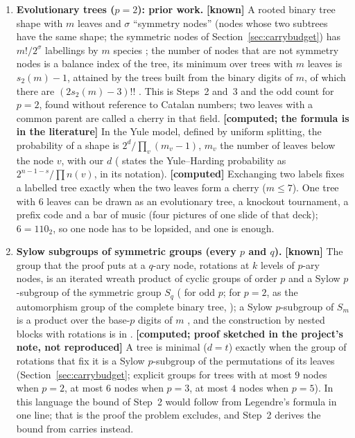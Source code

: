 \documentclass[11pt]{article}
\theoremstyle{definition}
\theoremstyle{remark}
\numberwithin{equation}{section}
\numberwithin{figure}{section}
\begin{document}
\begin{enumerate}[leftmargin=1.6em,itemsep=3pt]
\item \textbf{Evolutionary trees ($p=2$): prior work.} \textbf{[known]} A rooted binary tree shape with $m$
leaves and $\sigma$ ``symmetry nodes'' (nodes whose two subtrees have the same shape; the symmetric nodes of
Section~\ref{sec:carrybudget}) has $m!/2^{\sigma}$ labellings by
$m$ species \cite{Steel2014,BonaFlajolet}; the number of nodes that are not symmetry nodes is a balance index
of the tree, its minimum over trees with $m$ leaves is $s_2(m)-1$, attained by the trees built from the binary
digits of $m$, of which there are $(2s_2(m)-3)!!$ \cite{KerstingFischer}. This is Steps~2 and~3 and the odd
count for $p=2$, found without reference to Catalan numbers; two leaves with a common parent are called a
cherry in that field. \textbf{[computed; the formula is in the literature]} In the Yule model, defined by
uniform splitting, the probability of a shape is $2^{d}/\prod_v(m_v-1)$, $m_v$ the number of leaves below the
node $v$, with our $d$ (\cite{Steel2025} states the Yule--Harding probability as $2^{n-1-s}/\prod n(v)$, in
its notation). \textbf{[computed]} Exchanging two labels fixes a labelled tree exactly when the two leaves form a cherry
($m\le7$). One tree with $6$ leaves can be drawn as an evolutionary tree, a knockout tournament, a prefix
code and a bar of music (four pictures of one slide of that deck); $6=110_2$, so one node has to be lopsided,
and one is enough.

\item \textbf{Sylow subgroups of symmetric groups (every $p$ and $q$).} \textbf{[known]} The group that the
proof puts at a $q$-ary node, rotations at $k$ levels of $p$-ary nodes, is an iterated wreath product of
cyclic groups of order $p$ and a Sylow $p$-subgroup of the symmetric group $S_q$ (\cite{GiannelliLaw} for odd
$p$; for $p=2$, as the automorphism group of the complete binary tree, \cite{DeutschSagan}); a Sylow
$p$-subgroup of $S_m$ is a product over the base-$p$ digits of $m$ \cite{Kaloujnine}, and the construction
by nested blocks with rotations is in \cite{Smith}. \textbf{[computed; proof sketched in the project's note, not
reproduced]} A tree is minimal ($d=t$) exactly when the group of rotations that fix it is a Sylow
$p$-subgroup of the permutations of its leaves (Section~\ref{sec:carrybudget}; explicit groups for trees with at most $9$ nodes
when $p=2$, at most $6$ nodes when $p=3$, at most $4$ nodes when $p=5$). In this language the bound of Step~2 would follow from Legendre's
formula in one line; that is the proof the problem excludes, and Step~2 derives the bound from carries
instead.


\end{enumerate}
\end{document}
